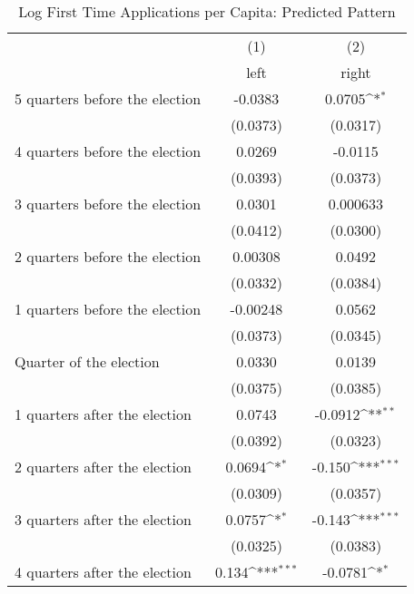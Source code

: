 \begin{table}[htbp]\centering
\def\sym#1{\ifmmode^{#1}\else\(^{#1}\)\fi}
\caption{Log First Time Applications per Capita: Predicted Pattern}
\begin{tabular}{l*{2}{c}}
\hline\hline
                    &\multicolumn{1}{c}{(1)}&\multicolumn{1}{c}{(2)}\\
                    &\multicolumn{1}{c}{left}&\multicolumn{1}{c}{right}\\
\hline
 5 quarters before the election&     -0.0383         &      0.0705\sym{*}  \\
                    &    (0.0373)         &    (0.0317)         \\
[1em]
 4 quarters before the election&      0.0269         &     -0.0115         \\
                    &    (0.0393)         &    (0.0373)         \\
[1em]
 3 quarters before the election&      0.0301         &    0.000633         \\
                    &    (0.0412)         &    (0.0300)         \\
[1em]
 2 quarters before the election&     0.00308         &      0.0492         \\
                    &    (0.0332)         &    (0.0384)         \\
[1em]
 1 quarters before the election&    -0.00248         &      0.0562         \\
                    &    (0.0373)         &    (0.0345)         \\
[1em]
Quarter of the election&      0.0330         &      0.0139         \\
                    &    (0.0375)         &    (0.0385)         \\
[1em]
 1 quarters after the election&      0.0743         &     -0.0912\sym{**} \\
                    &    (0.0392)         &    (0.0323)         \\
[1em]
 2 quarters after the election&      0.0694\sym{*}  &      -0.150\sym{***}\\
                    &    (0.0309)         &    (0.0357)         \\
[1em]
 3 quarters after the election&      0.0757\sym{*}  &      -0.143\sym{***}\\
                    &    (0.0325)         &    (0.0383)         \\
[1em]
 4 quarters after the election&       0.134\sym{***}&     -0.0781\sym{*}  \\

\end{tabular}
\end{table}
